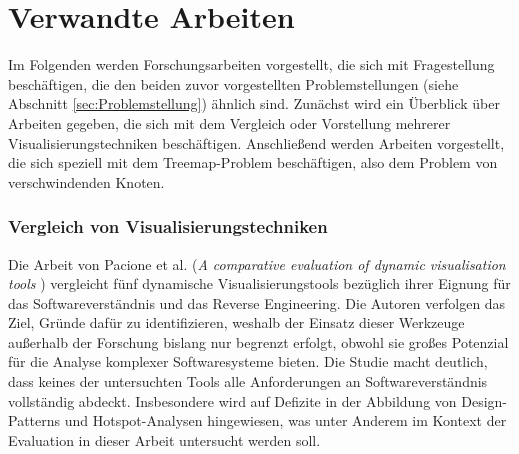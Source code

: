 \chapter{Verwandte Arbeiten} \label{sec:VerwandteArbeiten}
Im Folgenden werden Forschungsarbeiten vorgestellt, die sich mit Fragestellung beschäftigen, die den beiden zuvor vorgestellten Problemstellungen (siehe Abschnitt \ref{sec:Problemstellung}) ähnlich sind. Zunächst wird ein Überblick über Arbeiten gegeben, die sich mit dem Vergleich oder Vorstellung mehrerer Visualisierungstechniken beschäftigen. Anschließend werden Arbeiten vorgestellt, die sich speziell mit dem Treemap-Problem beschäftigen, also dem Problem von verschwindenden Knoten.




\subsection{Vergleich von Visualisierungstechniken} \label{sec:VergleichVisualisierungstechniken}

Die Arbeit von Pacione et al. (\textit{A comparative evaluation of dynamic visualisation tools} \cite{pacione2003comparative}) vergleicht fünf dynamische Visualisierungstools bezüglich ihrer Eignung für das Softwareverständnis und das Reverse Engineering. Die Autoren verfolgen das Ziel, Gründe dafür zu identifizieren, weshalb der Einsatz dieser Werkzeuge außerhalb der Forschung bislang nur begrenzt erfolgt, obwohl sie großes Potenzial für die Analyse komplexer Softwaresysteme bieten. Die Studie macht deutlich, dass keines der untersuchten Tools alle Anforderungen an Softwareverständnis vollständig abdeckt. Insbesondere wird auf Defizite in der Abbildung von Design-Patterns und Hotspot-Analysen hingewiesen, was unter Anderem im Kontext der Evaluation in dieser Arbeit untersucht werden soll.

